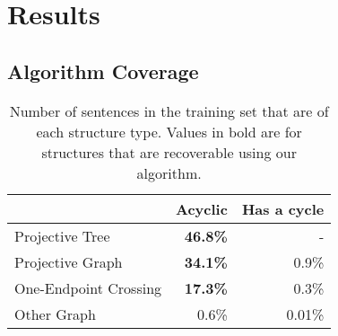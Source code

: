 
\section{Results}

\subsection{Algorithm Coverage}

\begin{table}
  \centering
  \begin{tabular}{|lrr|}
    \hline
      & Acyclic & Has a cycle \\
    \hline
    \hline
    Projective Tree & \textbf{46.8\%} & - \\
    Projective Graph & \textbf{34.1\%} & 0.9\% \\
    One-Endpoint Crossing & \textbf{17.3\%} & 0.3\% \\
    Other Graph & 0.6\% & 0.01\% \\
    \hline
  \end{tabular}
  \caption[Number of sentences in the training set that are of each structure type.]{ \label{tab:structures}
    Number of sentences in the training set that are of each structure type.
    Values in bold are for structures that are recoverable using our algorithm.
  }
\end{table}


